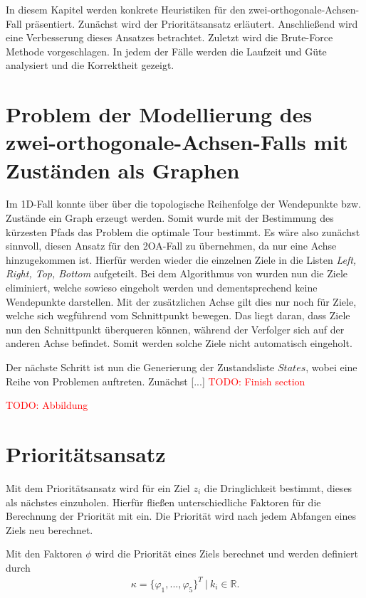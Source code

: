 \documentclass[german,version-2019-11]{uzl-thesis}
\begin{document}
In diesem Kapitel werden konkrete Heuristiken für den zwei-orthogonale-Achsen-Fall präsentiert. Zunächst wird der Prioritätsansatz erläutert. Anschließend wird eine Verbesserung dieses Ansatzes betrachtet. Zuletzt wird die Brute-Force Methode vorgeschlagen. In jedem der Fälle werden die Laufzeit und Güte analysiert und die Korrektheit gezeigt.

\section{Problem der Modellierung des zwei-orthogonale-Achsen-Falls mit Zuständen als Graphen}
Im 1D-Fall konnte über über die topologische Reihenfolge der Wendepunkte bzw. Zustände ein Graph erzeugt werden. Somit wurde mit der Bestimmung des kürzesten Pfads das Problem die optimale Tour bestimmt. 
Es wäre also zunächst sinnvoll, diesen Ansatz für den 2OA-Fall zu übernehmen, da nur eine Achse hinzugekommen ist. Hierfür werden wieder die einzelnen Ziele in die Listen \emph{Left, Right, Top, Bottom} aufgeteilt. Bei dem Algorithmus von \cite{helvig} wurden nun die Ziele eliminiert, welche sowieso eingeholt werden und dementsprechend keine Wendepunkte darstellen. Mit der zusätzlichen Achse gilt dies nur noch für Ziele, welche sich wegführend vom Schnittpunkt bewegen. Das liegt daran, dass Ziele nun den Schnittpunkt überqueren können, während der Verfolger sich auf der anderen Achse befindet. Somit werden solche Ziele nicht automatisch eingeholt. 

Der nächste Schritt ist nun die Generierung der Zustandsliste $States$, wobei eine Reihe von Problemen auftreten. Zunächst [...]
\textcolor{red}{TODO: Finish section}

\textcolor{red}{TODO: Abbildung}
\newpage

\section{Prioritätsansatz}

Mit dem Prioritätsansatz wird für ein Ziel $z_i$ die Dringlichkeit bestimmt, dieses als nächstes einzuholen. Hierfür fließen unterschiedliche Faktoren für die Berechnung der Priorität mit ein. Die Priorität wird nach jedem Abfangen eines Ziels neu berechnet.

\begin{definition}
Mit den Faktoren $\phi$ wird die Priorität eines Ziels berechnet und werden definiert durch
\begin{align*}
\kappa = \{\varphi_1,...,\varphi_5\}^T~|~k_i \in\mathbb{R}.
\end{align*}
\end{definition}
\end{document}
